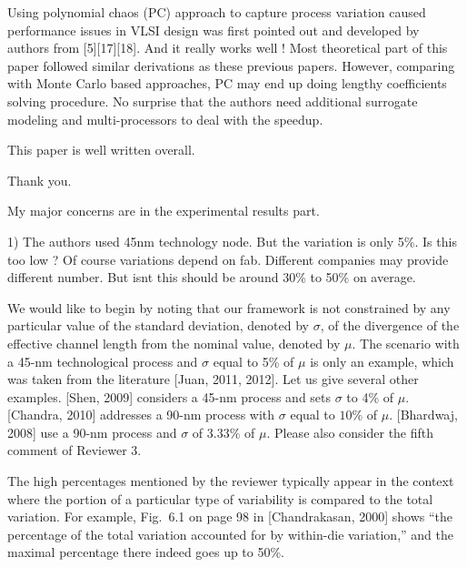 \begin{reviewer}
Using polynomial chaos (PC) approach to capture process variation caused performance issues in VLSI design was first pointed out and developed by authors from [5][17][18]. And it really works well ! Most theoretical part of this paper followed similar derivations as these previous papers. However, comparing with Monte Carlo based approaches, PC may end up doing  lengthy  coefficients solving procedure. No surprise that the authors need additional surrogate modeling and multi-processors to deal with the speedup.

This paper is well written overall.
\end{reviewer}
\begin{authors}
Thank you.
\end{authors}

\begin{reviewer}
My major concerns are in the experimental results part.

1) The authors used 45nm technology node. But the variation is only 5\%. Is this too low ? Of course variations depend on fab. Different companies may provide different number. But isnt this should be around 30\% to 50\% on average.
\end{reviewer}
\begin{authors}
We would like to begin by noting that our framework is not constrained by any particular value of the standard deviation, denoted by $\sigma$, of the divergence of the effective channel length from the nominal value, denoted by $\mu$.
The scenario with a 45-nm technological process and $\sigma$ equal to 5\% of $\mu$ is only an example, which was taken from the literature [Juan, 2011, 2012].
Let us give several other examples.
[Shen, 2009] considers a 45-nm process and sets $\sigma$ to 4\% of $\mu$.
[Chandra, 2010] addresses a 90-nm process with $\sigma$ equal to $10\%$ of $\mu$.
[Bhardwaj, 2008] use a 90-nm process and $\sigma$ of 3.33\% of $\mu$.
Please also consider the fifth comment of Reviewer 3.

The high percentages mentioned by the reviewer typically appear in the context where the portion of a particular type of variability is compared to the total variation.
For example, Fig.~6.1 on page 98 in [Chandrakasan, 2000] shows ``the percentage of the total variation accounted for by within-die variation,'' and the maximal percentage there indeed goes up to 50\%.

\begin{actions}
\end{actions}
\end{authors}


